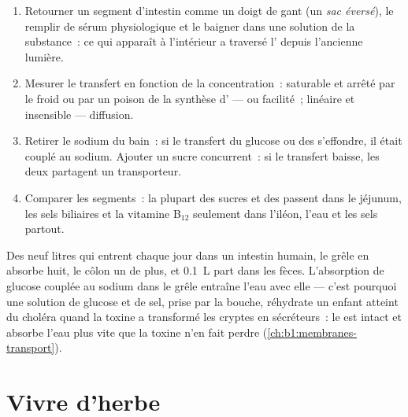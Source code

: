 \begin{method}\label{met:b1:digestion-absorption:everted}
\begin{enumerate}
  \item Retourner un segment d'intestin comme un doigt de gant (un
        \emph{sac éversé}), le remplir de sérum physiologique et le
        baigner dans une solution de la substance~: ce qui apparaît à
        l'intérieur a traversé l' depuis l'ancienne lumière.
  \item Mesurer le transfert en fonction de la concentration~: saturable
        et arrêté par le froid ou par un poison de la synthèse d'
        ---  ou facilité~; linéaire et insensible ---
        diffusion.
  \item Retirer le sodium du bain~: si le transfert du glucose ou des
         s'effondre, il était couplé au sodium. Ajouter un
        sucre concurrent~: si le transfert baisse, les deux partagent un
        transporteur.
  \item Comparer les segments~: la plupart des sucres et des  passent dans le jéjunum, les sels biliaires et la
        vitamine B$_{12}$ seulement dans l'iléon, l'eau et les sels
        partout.
\end{enumerate}
\end{method}

\begin{example}\label{ex:b1:digestion-absorption:water}
Des neuf litres qui entrent chaque jour dans un intestin humain, le
grêle en absorbe huit, le côlon un de plus, et \qty{0.1}{L} part dans
les fèces. L'absorption de glucose couplée au sodium dans le grêle
entraîne l'eau avec elle --- c'est pourquoi une solution de glucose et
de sel, prise par la bouche, réhydrate un enfant atteint du choléra
quand la toxine a transformé les cryptes en sécréteurs~: le 
est intact et absorbe l'eau plus vite que la toxine n'en fait perdre
(\cref{ch:b1:membranes-transport}).
\end{example}

\section{Vivre d'herbe}

